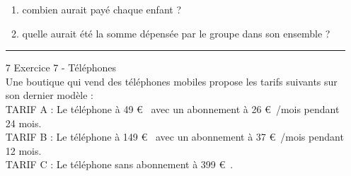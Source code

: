 \documentclass[11pt]{article}
\begin{document}
\begin{multicols}{2}
\begin{enumerate}
\begin{enumerate}
  \item combien aurait payé chaque enfant ?
  \item quelle aurait été la somme dépensée par le groupe dans son ensemble ?
  \end{enumerate}
\rule{\linewidth}{0.5pt}
\item[7] Exercice 7 - Téléphones\\
  Une boutique qui vend des téléphones mobiles propose les tarifs suivants sur son dernier modèle :\\
  TARIF A : Le téléphone à 49 \euro~ avec un abonnement à 26 \euro~/mois pendant 24 mois.\\
  TARIF B : Le téléphone à 149 \euro~ avec un abonnement à 37 \euro~/mois pendant 12 mois.\\
  TARIF C : Le téléphone sans abonnement à 399 \euro~.\\
  

\end{enumerate}
\end{multicols}
\end{document}

